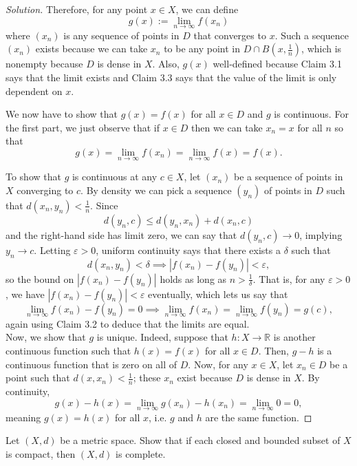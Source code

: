 \documentclass[11pt]{scrartcl}
\providecommand{\eps}{\varepsilon}
\providecommand{\RR}{\mathbb R}
\newenvironment{soln}{\begin{proof}[Solution]}{\end{proof}}
\begin{document}
\begin{soln}
	Therefore, for any point $x\in X$, we can define
	\[g(x) := \lim_{n\to\infty} f(x_n)\]
	where $(x_n)$ is any sequence of points in $D$ that converges to $x$.
	Such a sequence $(x_n)$ exists because we can take
	$x_n$ to be any point in $D\cap B(x, \frac 1n)$, which is nonempty
	because $D$ is dense in $X$.
	Also, $g(x)$ well-defined because Claim 3.1 says that the limit exists
	and Claim 3.3 says that the value of the limit is only dependent on $x$.
	
	We now have to show that $g(x) = f(x)$ for all $x\in D$
	and $g$ is continuous. For the first part, we just observe that
	if $x\in D$ then we can take $x_n = x$ for all $n$ so that
	\[g(x) = \lim_{n\to\infty} f(x_n) = \lim_{n\to\infty} f(x) = f(x).\]
	
	To show that $g$ is continuous at any $c\in X$,
	let $(x_n)$ be a sequence of points in $X$ converging to $c$.
	By density we can pick a sequence $(y_n)$ of points in $D$
	such that $d(x_n, y_n) < \frac 1n$.
	Since
	\[d(y_n, c) \le d(y_n, x_n) + d(x_n, c)\]
	and the right-hand side has limit zero, we can say that
	$d(y_n, c) \to 0$, implying $y_n\to c$.
	Letting $\eps > 0$,
	uniform continuity says that there exists a $\delta$ such that
	\[d(x_n, y_n) < \delta \implies |f(x_n) - f(y_n)| < \eps,\]
	so the bound on $|f(x_n) - f(y_n)|$ holds as long as $n > \frac 1\delta$.
	That is, for any $\eps > 0$, we have $|f(x_n) - f(y_n)| < \eps$ eventually,
	which lets us say that
	\[\lim_{n\to\infty} f(x_n) - f(y_n) = 0
	\implies \lim_{n\to\infty} f(x_n) = \lim_{n\to\infty} f(y_n) = g(c),\]
	again using Claim 3.2 to deduce that the limits are equal.\\
	
	Now, we show that $g$ is unique. Indeed, suppose that $h\colon X\to\RR$
	is another continuous function such that $h(x) = f(x)$ for all $x\in D$.
	Then, $g - h$ is a continuous function that is zero
	on all of $D$. Now, for any $x\in X$, let $x_n\in D$
	be a point such that $d(x, x_n) < \frac 1n$;
	these $x_n$ exist because $D$ is dense in $X$. By continuity,
	\[g(x) - h(x) = \lim_{n\to\infty} g(x_n) - h(x_n)
	= \lim_{n\to\infty} 0 = 0,\]
	meaning $g(x) = h(x)$ for all $x$, i.e. $g$ and $h$ are the same function.
\end{soln}

\begin{problem}
	Let $(X, d)$ be a metric space.
	Show that if each closed and bounded subset of $X$ is compact,
	then $(X, d)$ is complete.
\end{problem}
\end{document}
